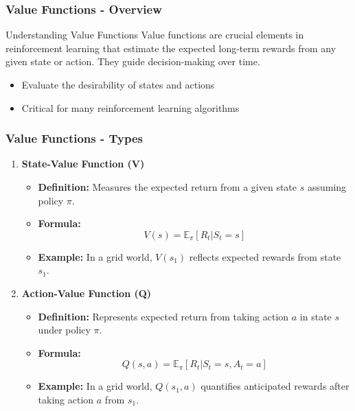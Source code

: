 \documentclass[aspectratio=169]{beamer}
\begin{document}
\begin{frame}[fragile]
    \frametitle{Value Functions - Overview}
    \begin{block}{Understanding Value Functions}
        Value functions are crucial elements in reinforcement learning that estimate the expected long-term rewards from any given state or action. They guide decision-making over time.
    \end{block}
    
    \begin{itemize}
        \item Evaluate the desirability of states and actions
        \item Critical for many reinforcement learning algorithms
    \end{itemize}
\end{frame}

\begin{frame}[fragile]
    \frametitle{Value Functions - Types}
    \begin{enumerate}
        \item \textbf{State-Value Function (V)}
            \begin{itemize}
                \item \textbf{Definition:} Measures the expected return from a given state $s$ assuming policy $\pi$.
                \item \textbf{Formula:}
                \begin{equation}
                    V(s) = \mathbb{E}_{\pi} \left[ R_t | S_t = s \right]
                \end{equation}
                \item \textbf{Example:} In a grid world, $V(s_1)$ reflects expected rewards from state $s_1$.
            \end{itemize}
        \item \textbf{Action-Value Function (Q)}
            \begin{itemize}
                \item \textbf{Definition:} Represents expected return from taking action $a$ in state $s$ under policy $\pi$.
                \item \textbf{Formula:}
                \begin{equation}
                    Q(s, a) = \mathbb{E}_{\pi} \left[ R_t | S_t = s, A_t = a \right]
                \end{equation}
                \item \textbf{Example:} In a grid world, $Q(s_1, a)$ quantifies anticipated rewards after taking action $a$ from $s_1$.
            \end{itemize}
    \end{enumerate}
\end{frame}
\end{document}
